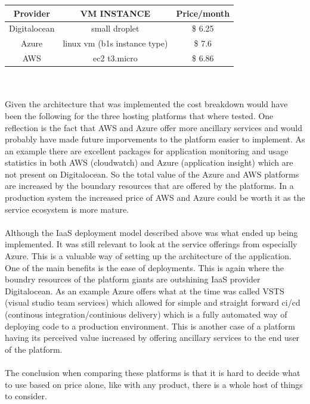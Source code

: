 \documentclass[]{uiophd}
\begin{document}
\begin{center}
 \begin{tabular}{||c | c | c ||} 
 \hline
 Provider & VM INSTANCE & Price/month \\ [0.5ex] 
 \hline\hline
 Digitalocean & small droplet & \$ 6.25 \\ 
 \hline
 Azure & linux vm (b1s instance type) &\$ 7.6 \\
 \hline
 AWS & ec2 t3.micro &\$ 6.86 \\
 \hline
\end{tabular}
\end{center}
\\\\
Given the architecture that was implemented the cost breakdown would have been the following for the three hosting platforms that where tested. One reflection is the fact that AWS and Azure offer more ancillary services and would probably have made future imporvements to the platform easier to implement. As an example there are excellent packages for application monitoring and usage statistics in both AWS (cloudwatch) and Azure (application insight) which are not present on Digitalocean. So the total value of the Azure and AWS platforms are increased by the boundary resources that are offered by the platforms. In a production system the increased price of AWS and Azure could be worth it as the service ecosystem is more mature. 
\\\\
Although the IaaS deployment model described above was what ended up being implemented. It was still relevant to look at the service offerings from especially Azure. This is a valuable way of setting up the architecture of the application. One of the main benefits is the ease of deployments. This is again where the boundry resources of the platform giants are outshining IaaS provider Digitalocean. As an example Azure offers what at the time was called VSTS (visual studio team services) which allowed for simple and straight forward ci/cd (continous integration/continious delivery) which is a fully automated way of deploying code to a production environment. This is another case of a platform having its perceived value increased by offering ancillary services to the end user of the platform. 
\\\\
The conclusion when comparing these platforms is that it is hard to decide what to use based on price alone, like with any product, there is a whole host of things to consider.
\end{document}
